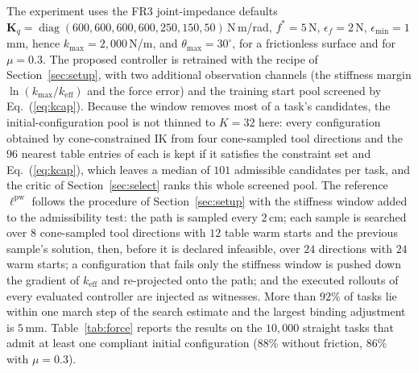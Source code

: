 \documentclass[journal, twoside]{IEEEtran}
\begin{document}
The experiment uses the FR3 joint-impedance defaults
$\mathbf{K}_{q}=\operatorname{diag}(600,600,600,600,250,150,50)$\,N\,m/rad,
$f^{\ast}=5$\,N, $\epsilon_{f}=2$\,N, $\epsilon_{\min}=1$\,mm, hence
$k_{\max}=2{,}000$\,N/m, and $\theta_{\max}=30^{\circ}$, for a frictionless
surface and for $\mu=0.3$. The proposed controller is retrained with the
recipe of Section~\ref{sec:setup}, with two additional observation
channels (the stiffness margin $\ln(k_{\max}/k_{\mathrm{eff}})$ and the
force error) and the training start pool screened by
Eq.~(\ref{eq:kcap}). Because the window removes most of a task's
candidates, the initial-configuration pool is not thinned to $K=32$ here:
every configuration obtained by cone-constrained IK from four
cone-sampled tool directions and the $96$ nearest table entries of each
is kept if it satisfies the constraint set and Eq.~(\ref{eq:kcap}),
which leaves a median of $101$ admissible candidates per task, and the
critic of Section~\ref{sec:select} ranks this whole screened pool. The
reference $\ell^{\mathrm{pw}}$ follows the procedure of
Section~\ref{sec:setup} with the stiffness window added to the
admissibility test: the path is sampled every $2$\,cm; each sample is
searched over $8$ cone-sampled tool directions with $12$ table warm
starts and the previous sample's solution, then, before it is declared
infeasible, over $24$ directions with $24$ warm starts; a configuration
that fails only the stiffness window is pushed down the gradient of
$k_{\mathrm{eff}}$ and re-projected onto the path; and the executed
rollouts of every evaluated controller are injected as witnesses. More
than $92\%$ of tasks lie within one march step of the search estimate
and the largest binding adjustment is $5$\,mm. Table~\ref{tab:force} reports the
results on the $10{,}000$ straight tasks that admit at least one
compliant initial configuration ($88\%$ without friction, $86\%$ with
$\mu=0.3$).
\end{document}
